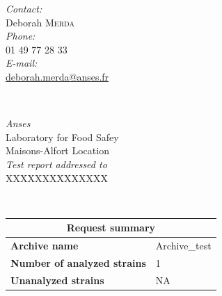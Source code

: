 \documentclass[a4paper]{article}
\begin{document}
\begin{titlepage}

\begin{minipage}{0.4\textwidth}
\begin{flushleft} \large
\emph{Contact:}\\
Deborah \textsc{Merda} \\ 
\emph{Phone:}\\
01 49 77 28 33\\
\emph{E-mail:}\\
\href{mailto:deborah.merda@anses.fr}{deborah.merda@anses.fr}
\end{flushleft}
\end{minipage}
~
\begin{minipage}{0.5\textwidth}
\begin{flushright} \large
\emph{Anses} \\
Laboratory for Food Safey \\
Maisons-Alfort Location\\
[0.5cm] \emph{Test report addressed to } \\
XXXXXXXXXXXXXX\\ %
\end{flushright}
\end{minipage}\\[3cm]

{\renewcommand{\arraystretch}{2} %
{\setlength{\tabcolsep}{1.5cm} %
\begin{tabular}{|l|l|}
  \hline
  \multicolumn{2}{|c|}{\textbf{\Large{Request summary}}} \\
  \hline
  \textbf{\Large{Archive name}} & \Large{Archive\_test} \\%
  \textbf{\Large{Number of analyzed strains}} & \Large{1} \\%
  \textbf{\Large{Unanalyzed strains}} & \Large{NA} \\%
  \hline
\end{tabular}\\[2cm]
}}


\end{titlepage}
\end{document}
